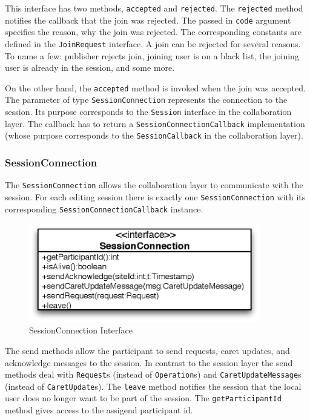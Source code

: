 This interface has two methods, \texttt{accepted} and \texttt{rejected}.
The \texttt{rejected} method notifies the callback that the join
was rejected. The passed in \texttt{code} argument specifies the reason, why
the join was rejected. The corresponding constants are defined in the
\texttt{JoinRequest} interface. A join can be rejected for several reasons.
To name a few: publisher rejects join, joining user is on a black list,
the joining user is already in the session, and some more.

On the other hand, the \texttt{accepted} method is invoked when the join
was accepted. The parameter of type \texttt{SessionConnection} represents
the connection to the session. Its purpose corresponds to the \texttt{Session}
interface in the collaboration layer. The callback has to return a
\texttt{SessionConnectionCallback} implementation (whose purpose corresponds
to the \texttt{SessionCallback} in the collaboration layer).


\subsubsection{SessionConnection}
The \texttt{SessionConnection} allows the collaboration layer to
communicate with the session. For each editing session there is
exactly one \texttt{SessionConnection} with its corresponding
\texttt{SessionConnectionCallback} instance.

\begin{figure}[H]
 \centering
 \includegraphics[width=10.09cm,height=4.30cm]{../images/finalreport/architecture_sessionconnection_uml.eps}
 \caption{SessionConnection Interface}
\end{figure}

The send methods allow the participant to send requests, caret updates,
and acknowledge messages to the session. In contrast to the session
layer the send methods deal with \texttt{Request}s (instead of
\texttt{Operation}s) and \texttt{CaretUpdateMessage}s (instead of
\texttt{CaretUpdate}s). The
\texttt{leave} method notifies the session that the local user does
no longer want to be part of the session. The \texttt{getParticipantId}
method gives access to the assigend participant id.


